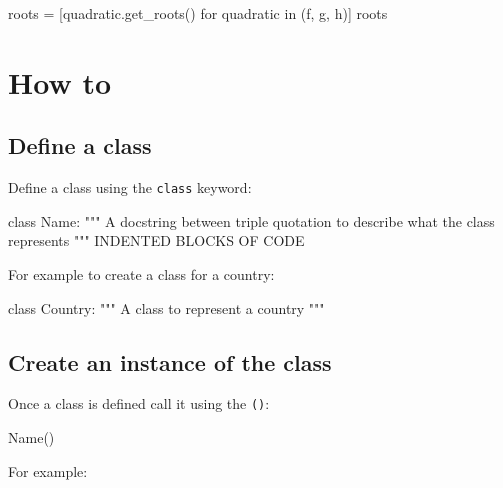 \begin{pyin}
roots = [quadratic.get_roots() for quadratic in (f, g, h)]
roots
\end{pyin}





\begin{raw}
[((-1.4, 0), (1.0, 0)),
 ((1.3971808598447282, 0), (-2.1471808598447284, 0)),
 ((-0.5, 2.179449471770337), (-0.5, -2.179449471770337))]
\end{raw}








\section{How to}

\subsection{Define a class}

Define a class using the \texttt{class} keyword:


\begin{pyin}
class Name:
    """
    A docstring between triple quotation to describe what the class represents
    """
    INDENTED BLOCKS OF CODE
\end{pyin}



For example to create a class for a country:




\begin{pyin}
class Country:
    """
    A class to represent a country
    """
\end{pyin}





\subsection{Create an instance of the class}

Once a class is defined call it using the \texttt{()}:


\begin{pyin}
Name()
\end{pyin}



For example:





